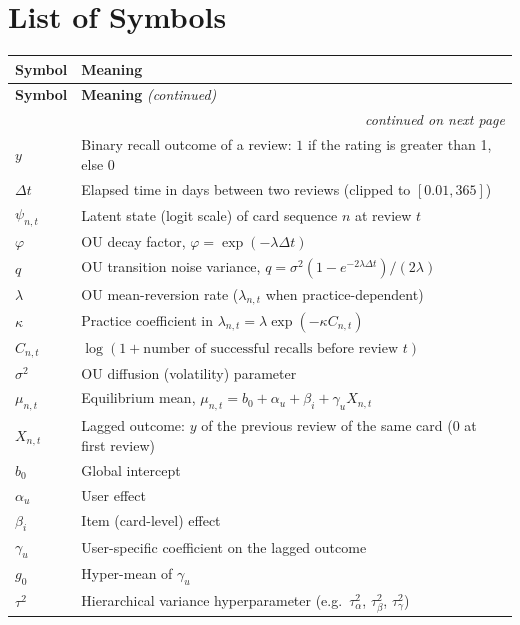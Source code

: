 \chapter*{List of Symbols}

\begin{longtable}{@{}p{3.2cm}p{10.3cm}@{}}
\toprule
\textbf{Symbol} & \textbf{Meaning}\\
\midrule
\endfirsthead
\toprule
\textbf{Symbol} & \textbf{Meaning} \emph{(continued)}\\
\midrule
\endhead
\midrule
\multicolumn{2}{r}{\emph{continued on next page}}\\
\endfoot
\bottomrule
\endlastfoot
$y$ & Binary recall outcome of a review: $1$ if the rating is greater than 1, else $0$\\
$\Delta t$ & Elapsed time in days between two reviews (clipped to $[0.01, 365]$)\\
$\psi_{n,t}$ & Latent state (logit scale) of card sequence $n$ at review $t$\\
$\varphi$ & OU decay factor, $\varphi = \exp(-\lambda \Delta t)$\\
$q$ & OU transition noise variance, $q = \sigma^2(1-e^{-2\lambda\Delta t})/(2\lambda)$\\
$\lambda$ & OU mean-reversion rate ($\lambda_{n,t}$ when practice-dependent)\\
$\kappa$ & Practice coefficient in $\lambda_{n,t} = \lambda\exp(-\kappa C_{n,t})$\\
$C_{n,t}$ & $\log(1 + \text{number of successful recalls before review } t)$\\
$\sigma^2$ & OU diffusion (volatility) parameter\\
$\mu_{n,t}$ & Equilibrium mean, $\mu_{n,t} = b_0 + \alpha_u + \beta_i + \gamma_u X_{n,t}$\\
$X_{n,t}$ & Lagged outcome: $y$ of the previous review of the same card (0 at first review)\\
$b_0$ & Global intercept\\
$\alpha_u$ & User effect\\
$\beta_i$ & Item (card-level) effect\\
$\gamma_u$ & User-specific coefficient on the lagged outcome\\
$g_0$ & Hyper-mean of $\gamma_u$\\
$\tau^2$ & Hierarchical variance hyperparameter (e.g.\ $\tau^2_\alpha$, $\tau^2_\beta$, $\tau^2_\gamma$)\\

\end{longtable}
